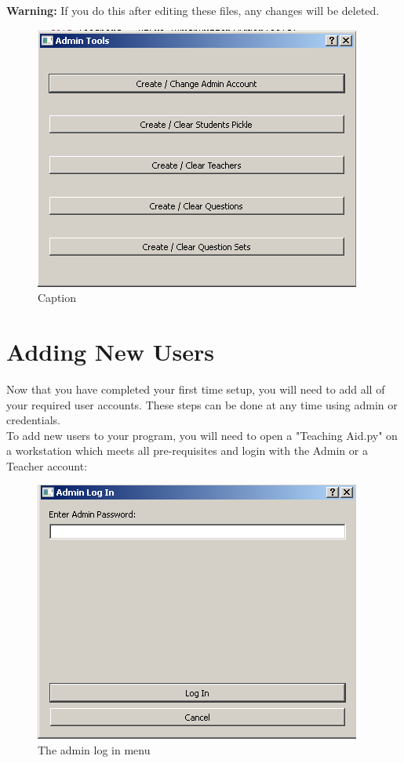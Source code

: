 \documentclass{report}
\begin{document}
\textbf{Warning: }If you do this after editing these files, any changes will be deleted.\\
\begin{figure}[h]
\centering
\includegraphics{AdminTools}
\caption{Caption}
\label{fig:admintools}
\end{figure}
\chapter{Adding New Users}
Now that you have completed your first time setup, you will need to add all of your required user accounts. These steps can be done at any time using admin or credentials.\\
To add new users to your program, you will need to open a "Teaching Aid.py" on a workstation which meets all pre-requisites and login with the Admin or a Teacher account:

\bigskip
\begin{figure}[h]
\centering
\includegraphics{adminlogin}
\caption{The admin log in menu}
\label{fig:adminlogin}
\end{figure}
\bigskip
\end{document}
